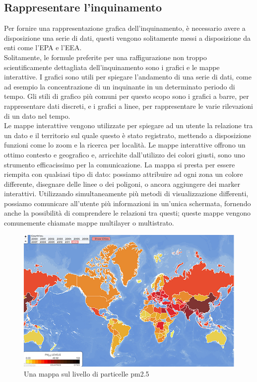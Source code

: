 \subsection{Rappresentare l'inquinamento}
Per fornire una rappresentazione grafica dell’inquinamento, è necessario avere a disposizione una serie di dati, questi vengono solitamente messi a disposizione da enti come l'EPA e l'EEA.
\\ 
Solitamente, le formule preferite per una raffigurazione non troppo scientificamente dettagliata dell’inquinamento sono i grafici e le mappe interattive.
I grafici sono utili per spiegare l'andamento di una serie di dati, come ad esempio la concentrazione di un inquinante in un determinato periodo di tempo.
Gli stili di grafico più comuni per questo scopo sono i grafici a barre, per rappresentare dati discreti, e i grafici a linee, per rappresentare le varie rilevazioni di un dato nel tempo.
\\ 
Le mappe interattive vengono utilizzate per spiegare ad un utente la relazione tra un dato e il territorio sul quale questo è stato registrato, mettendo a disposizione funzioni come lo zoom e la ricerca per località.
Le mappe interattive offrono un ottimo contesto e geografico e, arricchite dall'utilizzo dei colori giusti, sono uno strumento efficacissimo per la comunicazione.
La mappa si presta per essere riempita con qualsiasi tipo di dato: possiamo attribuire ad ogni zona un colore differente, disegnare delle linee o dei poligoni, o ancora aggiungere dei marker interattivi.
Utilizzando simultaneamente più metodi di visualizzazione differenti, possiamo comunicare all'utente più informazioni in un'unica schermata, fornendo anche la possibilità di comprendere le relazioni tra questi; queste mappe vengono comunemente chiamate mappe multilayer o multistrato.
\begin{figure}[H]
  \includegraphics[width=\linewidth]{img/mappapm.png}
  \caption{Una mappa sul livello di particelle pm2.5}
  \label{fig:pollution_map}
\end{figure}


